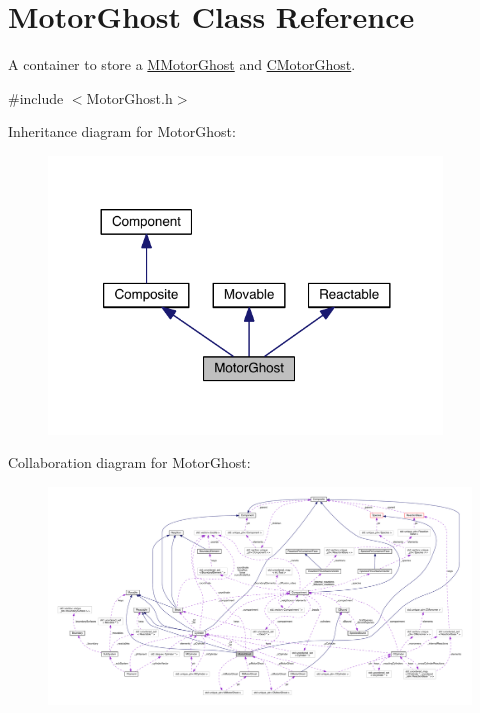 \hypertarget{classMotorGhost}{\section{Motor\+Ghost Class Reference}
\label{classMotorGhost}
}


A container to store a \hyperlink{classMMotorGhost}{M\+Motor\+Ghost} and \hyperlink{classCMotorGhost}{C\+Motor\+Ghost}.  




{\ttfamily \#include $<$Motor\+Ghost.\+h$>$}



Inheritance diagram for Motor\+Ghost\+:\nopagebreak
\begin{figure}[H]
\begin{center}
\leavevmode
\includegraphics[width=296pt]{classMotorGhost__inherit__graph}
\end{center}
\end{figure}


Collaboration diagram for Motor\+Ghost\+:
\nopagebreak
\begin{figure}[H]
\begin{center}
\leavevmode
\includegraphics[width=350pt]{classMotorGhost__coll__graph}
\end{center}
\end{figure}
